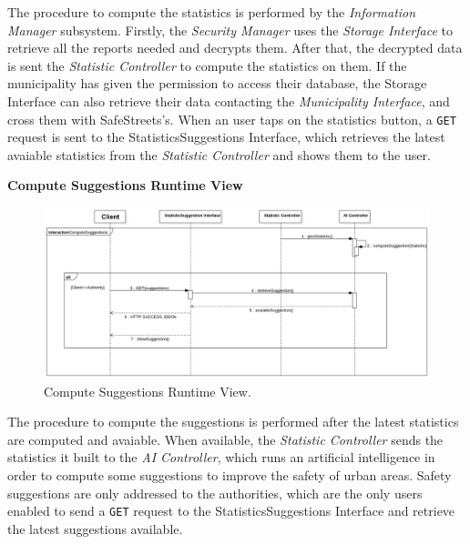 \documentclass{report}
\begin{document}
The procedure to compute the statistics is performed by the \textit{Information Manager} subsystem. Firstly, the \textit{
Security Manager} uses the \textit{Storage Interface} to retrieve all the reports needed and decrypts them.  After that, the decrypted data is sent the \textit{Statistic Controller} to compute the statistics on them. If the municipality has given the permission to access their database, the Storage Interface can also retrieve their data contacting the \textit{Municipality Interface}, and cross them with SafeStreets's.
When an user taps on the statistics button, a \texttt{GET} request is sent to the StatisticsSuggestions Interface, which retrieves the latest avaiable statistics from the \textit{Statistic Controller} and shows them to the user.

\begin{center}\large{\textbf{Compute Suggestions Runtime View}}\end{center}
\begin{figure}[H]
	\begin{center}
	\includegraphics[width=.9\textwidth]{img/ComputeSuggestions.png}
    \end{center}
    \label{fig:SuggestionsSD}
	\caption{Compute Suggestions Runtime View.}
\end{figure}
The procedure to compute the suggestions is performed after the latest statistics are computed and avaiable. When available, the \textit{Statistic Controller} sends the statistics it built to the \textit{AI Controller}, which runs an artificial intelligence in order to compute some suggestions to improve the safety of urban areas. Safety suggestions are only addressed to the authorities, which are the only users  enabled to send a \texttt{GET} request to the StatisticsSuggestions Interface and retrieve the latest suggestions available.
\end{document}
